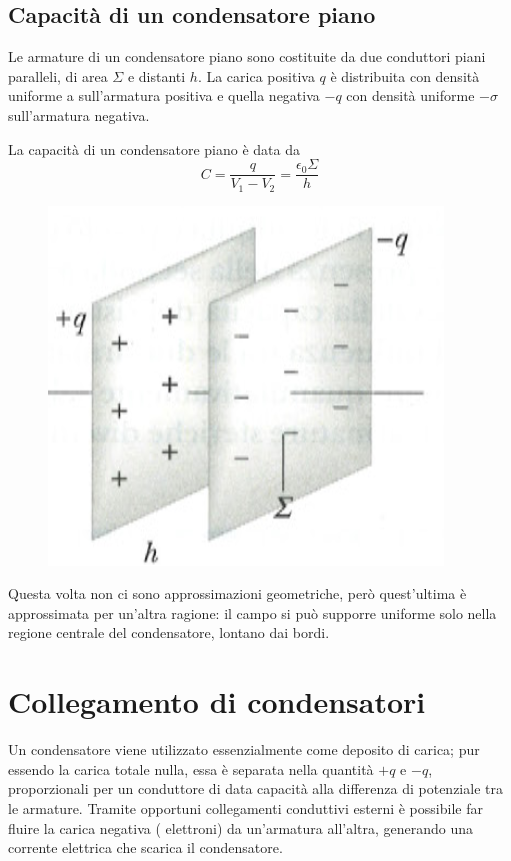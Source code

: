 \documentclass[class=book, crop=false, oneside, 12pt]{standalone}
\begin{document}
\subsection{Capacità di un condensatore piano}

Le armature di un condensatore piano sono costituite da due conduttori piani paralleli, di area \(\Sigma\) e distanti \(h\).
La carica positiva \(q\) è distribuita con densità uniforme a sull'armatura positiva e quella negativa \(- q\) con densità uniforme \(-\sigma\) sull'armatura negativa. 

La capacità di un condensatore piano è data da 
\begin{equation}
    C = \frac{q}{V_1 - V_2} = \frac{\epsilon_0 \Sigma}{h}
\end{equation}

\begin{figure}[h]
    \includegraphics[scale=0.4]{condensatore_piano.png}
    \centering
    \caption{}
\end{figure}

Questa volta non ci sono approssimazioni geometriche, però quest'ultima è approssimata per un'altra ragione: il campo si può supporre uniforme solo nella regione centrale del condensatore, lontano dai bordi.

\section{Collegamento di condensatori}

Un condensatore viene utilizzato essenzialmente come deposito di carica; pur essendo la carica totale nulla, essa è separata nella quantità \(+q\) e \(-q\), proporzionali per un conduttore di data capacità alla differenza di potenziale tra le armature.
Tramite opportuni collegamenti conduttivi esterni è possibile far fluire la carica negativa ( elettroni) da un'armatura all'altra, generando una corrente elettrica che scarica il condensatore. 
\end{document}
